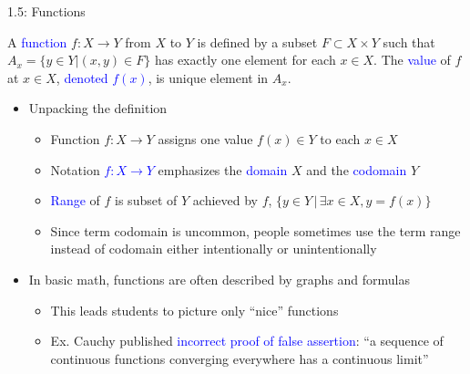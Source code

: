\documentclass[10pt,english,aspectratio=169,handout]{beamer}
\begin{document}
\begin{frame}{1.5: Functions}

\vspace{3mm}

\begin{definition}
A \textcolor{blue}{function} $f \colon X \rightarrow Y$ from $X$ to $Y$ is defined by a subset $F \subset X \times Y$ such that $A_x = \{ y\in Y | (x,y)\in F \}$ has exactly one element for each $x\in X$.
The \textcolor{blue}{value} of $f$ at $x\in X$, \textcolor{blue}{denoted $f(x)$}, is unique element in $A_x$.
\end{definition}

\begin{itemize}
\setlength\itemsep{3mm}
\item<2-> Unpacking the definition \vspace{1mm}
\begin{itemize} 
  \setlength\itemsep{1.5mm}
  \item<2-> Function $f \colon X\rightarrow Y$ assigns one value $f(x)\in Y$ to each $x\in X$
  \item<3-> Notation \textcolor{blue}{$f \colon X \rightarrow Y$} emphasizes the \textcolor{blue}{domain} $X$ and the \textcolor{blue}{codomain} $Y$
  \item<4-> \textcolor{blue}{Range} of $f$ is subset of $Y$ achieved by $f$, $\{y \in Y \,|\, \exists x\in X, y=f(x) \}$
  \item<5-> Since term codomain is uncommon, people sometimes use the term range instead of codomain either intentionally or unintentionally
\end{itemize}

\item<6-> In basic math, functions are often described by graphs and formulas \vspace{1mm}
\begin{itemize} 
  \setlength\itemsep{1.5mm}
  \item<6-> This leads students to picture only ``nice'' functions
  \item<7-> Ex. Cauchy published \textcolor{blue}{incorrect proof of false assertion}: ``a sequence of continuous functions converging everywhere has a continuous limit''
\end{itemize}

\end{itemize}
\end{frame}  
\end{document}
